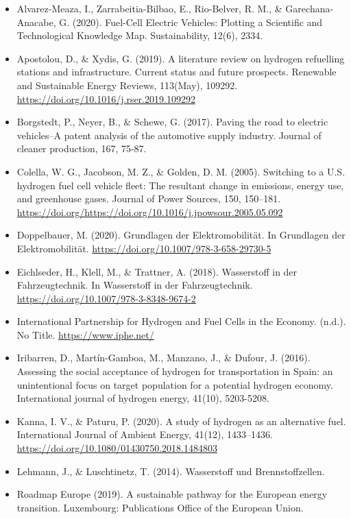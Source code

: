 \documentclass[
]{book}
\providecommand{\tightlist}{%
  \setlength{\itemsep}{0pt}\setlength{\parskip}{0pt}}
\begin{document}
\begin{itemize}
\tightlist
\item
  Alvarez-Meaza, I., Zarrabeitia-Bilbao, E., Rio-Belver, R. M., \& Garechana-Anacabe, G. (2020). Fuel-Cell Electric Vehicles: Plotting a Scientific and Technological Knowledge Map. Sustainability, 12(6), 2334.
\item
  Apostolou, D., \& Xydis, G. (2019). A literature review on hydrogen refuelling stations and infrastructure. Current status and future prospects. Renewable and Sustainable Energy Reviews, 113(May), 109292. \url{https://doi.org/10.1016/j.rser.2019.109292}
\item
  Borgstedt, P., Neyer, B., \& Schewe, G. (2017). Paving the road to electric vehicles--A patent analysis of the automotive supply industry. Journal of cleaner production, 167, 75-87.
\item
  Colella, W. G., Jacobson, M. Z., \& Golden, D. M. (2005). Switching to a U.S. hydrogen fuel cell vehicle fleet: The resultant change in emissions, energy use, and greenhouse gases. Journal of Power Sources, 150, 150--181. \url{https://doi.org/https://doi.org/10.1016/j.jpowsour.2005.05.092}
\item
  Doppelbauer, M. (2020). Grundlagen der Elektromobilität. In Grundlagen der Elektromobilität. \url{https://doi.org/10.1007/978-3-658-29730-5}
\item
  Eichlseder, H., Klell, M., \& Trattner, A. (2018). Wasserstoff in der Fahrzeugtechnik. In Wasserstoff in der Fahrzeugtechnik. \url{https://doi.org/10.1007/978-3-8348-9674-2}
\item
  International Partnership for Hydrogen and Fuel Cells in the Economy. (n.d.). No Title. \url{https://www.iphe.net/}
\item
  Iribarren, D., Martín-Gamboa, M., Manzano, J., \& Dufour, J. (2016). Assessing the social acceptance of hydrogen for transportation in Spain: an unintentional focus on target population for a potential hydrogen economy. International journal of hydrogen energy, 41(10), 5203-5208.
\item
  Kanna, I. V., \& Paturu, P. (2020). A study of hydrogen as an alternative fuel. International Journal of Ambient Energy, 41(12), 1433--1436. \url{https://doi.org/10.1080/01430750.2018.1484803}
\item
  Lehmann, J., \& Luschtinetz, T. (2014). Wasserstoff und Brennstoffzellen.
\item
  Roadmap Europe (2019). A sustainable pathway for the European energy transition. Luxembourg: Publications Office of the European Union.

\end{itemize}
\end{document}
